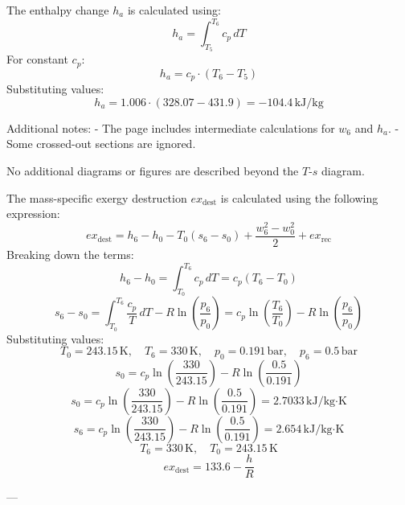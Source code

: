 The enthalpy change \( h_a \) is calculated using:  
\[
h_a = \int_{T_5}^{T_6} c_p \, dT
\]  
For constant \( c_p \):  
\[
h_a = c_p \cdot (T_6 - T_5)
\]  
Substituting values:  
\[
h_a = 1.006 \cdot (328.07 - 431.9) = -104.4 \, \text{kJ/kg}
\]  

Additional notes:  
- The page includes intermediate calculations for \( w_6 \) and \( h_a \).  
- Some crossed-out sections are ignored.  

No additional diagrams or figures are described beyond the \( T \)-\( s \) diagram.

The mass-specific exergy destruction \( ex_{\text{dest}} \) is calculated using the following expression:  
\[
ex_{\text{dest}} = h_6 - h_0 - T_0 (s_6 - s_0) + \frac{w_6^2 - w_0^2}{2} + ex_{\text{rec}}
\]  
Breaking down the terms:  
\[
h_6 - h_0 = \int_{T_0}^{T_6} c_p \, dT = c_p (T_6 - T_0)
\]  
\[
s_6 - s_0 = \int_{T_0}^{T_6} \frac{c_p}{T} \, dT - R \ln \left( \frac{p_6}{p_0} \right) = c_p \ln \left( \frac{T_6}{T_0} \right) - R \ln \left( \frac{p_6}{p_0} \right)
\]  
Substituting values:  
\[
T_0 = 243.15 \, \text{K}, \quad T_6 = 330 \, \text{K}, \quad p_0 = 0.191 \, \text{bar}, \quad p_6 = 0.5 \, \text{bar}
\]  
\[
s_0 = c_p \ln \left( \frac{330}{243.15} \right) - R \ln \left( \frac{0.5}{0.191} \right)
\]  
\[
s_0 = c_p \ln \left( \frac{330}{243.15} \right) - R \ln \left( \frac{0.5}{0.191} \right) = 2.7033 \, \text{kJ/kg·K}
\]  
\[
s_6 = c_p \ln \left( \frac{330}{243.15} \right) - R \ln \left( \frac{0.5}{0.191} \right) = 2.654 \, \text{kJ/kg·K}
\]  
\[
T_6 = 330 \, \text{K}, \quad T_0 = 243.15 \, \text{K}
\]  
\[
ex_{\text{dest}} = 133.6 - \frac{h}{R}
\]  

---